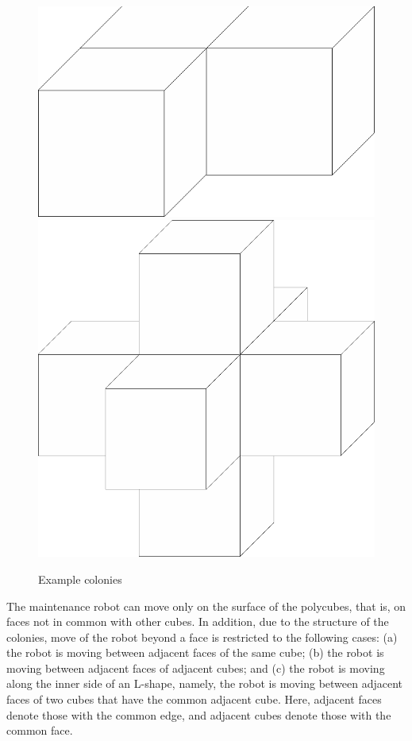 \begin{problem}
\begin{figure}[htbp]
\vspace{+\baselineskip}
\begin{center}
\includegraphics[scale=.5]{j1.eps}
\qquad
\includegraphics[scale=.5]{j2.eps}
\end{center}
\vspace{-\baselineskip}
\caption{Example colonies}
\end{figure}

The maintenance robot can move only on the surface of the polycubes, that is, on faces not in common with other cubes. 
In addition, due to the structure of the colonies, move of the robot beyond a face is restricted to the following cases: 
(a) the robot is moving between adjacent faces of the same cube; 
(b) the robot is moving between adjacent faces of adjacent cubes; and 
(c) the robot is moving along the inner side of an L-shape, namely, the robot is moving between adjacent faces of two cubes that have the common adjacent cube. 
Here, adjacent faces denote those with the common edge, and adjacent cubes denote those with the common face.


\end{problem}
